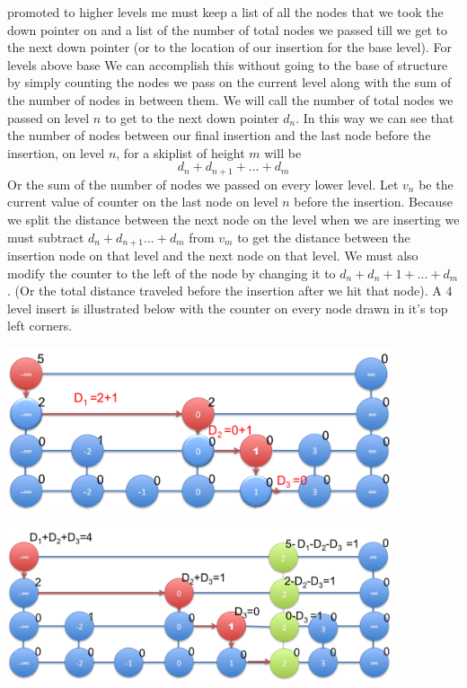 \documentclass[11pt]{article}
\begin{document}
\begin{enumerate}
\begin{description}
			promoted to higher levels me must keep a list of all 
				the nodes that we took the down pointer on
				and a list of the number of total
				nodes we passed till we get to the next down
				pointer (or to the location of our
				insertion for the base level). For levels above
				base
				We can accomplish this without going to the base of
				structure by simply counting the nodes we pass
				on the current level along with the sum of the
				number of nodes in between them.
			We will call the number of total nodes we passed on level $n$ to get
				to the next down pointer $d_n$.
				In this way we can see that the number of nodes
				between our final insertion and the last node 
				before the insertion, on level $n$, for a
				skiplist of height $m$ will be
				$$d_n + d_{n+1}+...+d_m$$
				Or the sum of the number of nodes we
				passed on every lower level.
			Let $v_n$ be the current value of counter 
				on the last node on level $n$ before the
				insertion.
			Because we split the distance between the next node on
				the level when we are inserting we must subtract
				$d_n + d_{n+1} ...+ d_m$ from $v_m$ to get the
				distance between the 
				insertion node on that level and the next node
				on that level.
				We must also modify the counter to the left of
				the node by changing it to $d_n + d_n+1 + ...+
				d_m$. (Or the total distance traveled before the
				insertion after we hit that node).
		A $4$ level insert is illustrated below with the counter on
				every node drawn in it's top left corners. 
		\begin{center}
		\includegraphics[width=0.85\textwidth]{images/sl1}
		\end{center}
		\begin{center}
		\includegraphics[width=0.85\textwidth]{images/sl2}
		\end{center}


\end{description}
\end{enumerate}
\end{document}
